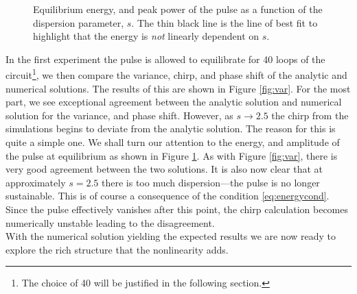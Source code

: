 \begin{figure}[tbp]
\centering

\caption[Equilibrium energy, and peak power of the pulse as a function of the dispersion parameter.]{Equilibrium energy, and peak power of the pulse as a function of the dispersion parameter, $s$. The thin black line is the line of best fit to highlight that the energy is \emph{not} linearly dependent on $s$.}
\label{fig:valenergy}
\end{figure}

In the first experiment the pulse is allowed to equilibrate for 40 loops of the circuit\footnote{The choice of 40 will be justified in the following section.}, we then compare the variance, chirp, and phase shift of the analytic and numerical solutions. The results of this are shown in Figure \ref{fig:var}. For the most part, we see exceptional agreement between the analytic solution and numerical solution for the variance, and phase shift. However, as $s \rightarrow 2.5$ the chirp from the simulations begins to deviate from the analytic solution. The reason for this is quite a simple one. We shall turn our attention to the energy, and amplitude of the pulse at equilibrium as shown in Figure \ref{fig:valenergy}. As with Figure \ref{fig:var}, there is very good agreement between the two solutions. It is also now clear that at approximately $s = 2.5$ there is too much dispersion---the pulse is no longer sustainable. This is of course a consequence of the condition \eqref{eq:energycond}. Since the pulse effectively vanishes after this point, the chirp calculation becomes numerically unstable leading to the disagreement. \\

With the numerical solution yielding the expected results we are now ready to explore the rich structure that the nonlinearity adds.

